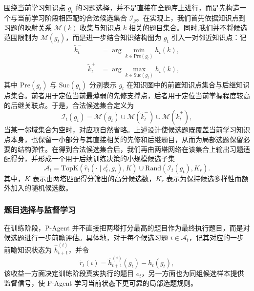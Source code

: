 \documentclass[11pt,a4paper]{article}
\begin{document}
围绕当前学习知识点 $g_t$ 的习题选择，并不是直接在全题库上进行，而是先构造一个与当前学习阶段相匹配的合法候选集合 $\mathcal{I}_g$。在实现上，我们首先依据知识点到习题的映射关系 $\mathcal{M}(k)$ 收集与知识点 $k$ 相关的题目集合。同时,我们并不将候选范围限制为 $\mathcal{M}(g_t)$，而是进一步结合知识结构图为 $g_t$ 引入一对邻近知识点：记
\begin{equation}
\begin{aligned}
\tilde{k}_t^{-}
&=
\arg\min_{k\in \mathrm{Pre}(g_t)} h_t(k),\\\qquad
\tilde{k}_t^{+}
&=
\arg\max_{k\in \mathrm{Suc}(g_t)} h_t(k),  
\end{aligned}
\end{equation}
其中 $\mathrm{Pre}(g_t)$ 与 $\mathrm{Suc}(g_t)$ 分别表示 $g_t$ 在知识图中的前置知识点集合与后继知识点集合。前者用于定位当前最薄弱的先修支撑点，后者用于定位当前掌握程度较高的后继关联点。于是，合法候选集合定义为
\begin{equation}
\mathcal{I}_t(g_t)
=
\mathcal{M}(g_t)\cup
\mathcal{M}(\tilde{k}_t^{-})\cup
\mathcal{M}(\tilde{k}_t^{+})
,
\end{equation}
当某一邻域集合为空时，对应项自然省略。上述设计使候选题既覆盖当前学习知识点本身，也保留一小部分与其直接相关的先修和后继题目，从而为局部选题保留必要的结构弹性。在得到合法候选集合后，我们再由两塔网络在该集合上输出习题适配得分，并形成一个用于后续训练决策的小规模候选子集
\begin{equation}
\mathcal{A}_t
=
\mathrm{TopK}\!\left(\hat{r}_{t}(\cdot\mid c_t^l,g_t),K\right)
\cup
\mathrm{Rand}\!\left(\mathcal{I}_t(g_t),K_r\right).
\end{equation}
其中，$K$ 表示由两塔匹配得分筛出的高分候选数，$K_r$ 表示为保持候选多样性而额外加入的随机候选数。

\subsubsection{题目选择与监督学习}

在训练阶段，P-Agent 并不直接把两塔打分最高的题目作为最终执行题目，而是对候选题进行一步前瞻评估。具体地，对于每个候选习题 $i\in\mathcal{A}_t$，记其对应的一步前瞻知识状态为 $\hat{h}_{t+1}^{(i)}$，并令
\begin{equation}
\tilde{r}_t(i)=
\hat{h}_{t+1}^{(i)}(g_t)-h_t(g_t),
\end{equation}
该收益一方面决定训练阶段真实执行的题目 $e_t$，另一方面也为同组候选样本提供监督信号，使 P-Agent 学习当前状态下更可靠的局部选题规则。
\end{document}
